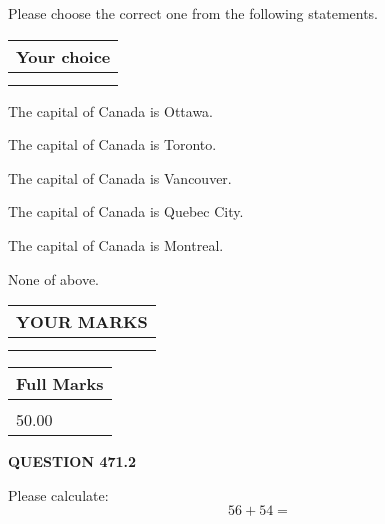 \documentclass[12pt]{article}
\begin{document}
  
Please choose the correct one from the following statements.
  
  
\noindent\hspace{3.0in} \begin{tabular}{|l|}
\hline
Your choice \\
\hline
 \\ 
 \\ 
\hline
\end{tabular}
  
  
 
 
The capital of Canada is Ottawa.
 
 
The capital of Canada is Toronto.
 
 
The capital of Canada is Vancouver.
 
 
The capital of Canada is Quebec City.
 
 
The capital of Canada is Montreal.
 
 
 None of above.
 
 
  
\vspace{0.2in}
  
\noindent\begin{tabular}{|l|}
\hline
 YOUR MARKS  \\
\hline
 \\ 
 \\ 
\hline
\end{tabular}
\hspace{0.05in} \begin{tabular}{|l|}
\hline
 Full Marks  \\
\hline
 \\ 
50.00 \\
\hline
\end{tabular}
{\textbf{\Large{QUESTION
471.2 
}}}
  
  
 
Please calculate:
\begin{equation}
56 +  %
54 = \nonumber
\end{equation}
 

 

 
   
   
 \vspace{0.2in}
 
   
   
   
   
\end{document}
